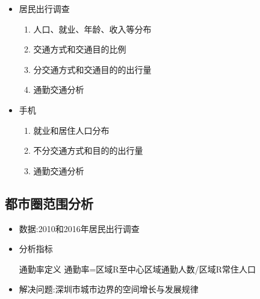 \begin{frame}[t]{\subsecname}
  \begin{itemize}
     \item<1-> 居民出行调查
        \begin{enumerate}
          \item 人口、就业、年龄、收入等分布
          \item 交通方式和交通目的比例
          \item 分交通方式和交通目的的出行量
          \item 通勤交通分析 
        \end{enumerate}
  \end{itemize}
  \begin{itemize}
     \item<2-> 手机
        \begin{enumerate}
          \item 就业和居住人口分布
          \item 不分交通方式和目的的出行量
          \item 通勤交通分析 
        \end{enumerate}
  \end{itemize}

\end{frame}

\subsection{都市圈范围分析}

\begin{frame}[t]{\subsecname}
\begin{itemize}
  \item<1-> 数据:2010和2016年居民出行调查
  \item<2-> 分析指标
\begin{commonbox}{通勤率定义} 
通勤率=区域R至中心区域通勤人数/区域R常住人口
\end{commonbox}

  \item<3-> 解决问题:深圳市城市边界的空间增长与发展规律
\end{itemize}
\end{frame}

\begin{frame}[t]{\subsecname}
\end{frame}

